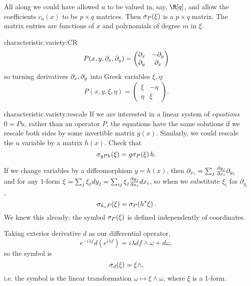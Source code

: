 All along we could have allowed \(u\) to be valued in, say, \(\R[q]\), and allow the coefficients \(c_a(x)\) to be \(p \times q\) matrices.
Then \(\opsymbol[P]{\xi}\) is a \(p \times q\) matrix.
The matrix entries are functions of \(x\) and polynomials of degree \(m\) in \(\xi\).
\begin{answer}{characteristic.variety:CR}
\[
P(x,y,\partial_{x},\partial_{y})
=
\begin{pmatrix}
\partial_{x}&-\partial_{y}\\
\partial_{y}&\partial_{x}
\end{pmatrix}
\]
so turning derivatives \(\partial_{x},\partial_{y}\) into Greek variables \(\xi,\eta\):
\[
P(x,y,\xi,\eta)
=
\begin{pmatrix}
\xi&-\eta\\
\eta&\xi
\end{pmatrix}.
\]
\end{answer}
\begin{problem}{characteristic.variety:rescale}
If we are interested in a linear system of \emph{equations} \(0=Pu\), rather than an operator \(P\), the equations have the same solutions if we rescale both sides by some invertible matrix \(g(x)\).
Similarly, we could rescale the \(u\) variable by a matrix \(h(x)\).
Check that 
\[
\opsymbol[gPh]{\xi}=g\opsymbol[P]{\xi}h.
\]
\end{problem}
If we change variables by a diffeomorphism \(y=h(x)\), then \(\partial_{x_i} = \sum_j \pderiv{y_j}{x_i} \partial_{y_j}\) and for any \(1\)-form \(\xi=\sum_j \xi_j dy_j=\sum_{ij} \xi_j \pderiv{y_j}{x_i} dx_i\), so when we substitute \(\xi_i\) for \(\partial_{y_i}\), 
\[
\opsymbol[h_* P]{\xi} = \opsymbol[P]{h^*\xi}.
\]
We knew this already: the symbol \(\opsymbol[P]{\xi}\) is defined independently of coordinates.
\begin{example}
Taking exterior derivative \(d\) as our differential operator,
\[
e^{-i \lambda f} d(e^{i \lambda f}) = i\lambda df \wedge \omega + d\omega,
\]
so the symbol is
\[
\opsymbol[d]{\xi}=\xi \wedge,
\]
i.e. the symbol is the linear transformation \(\omega \mapsto \xi \wedge \omega\), where \(\xi\) is a \(1\)-form.
\end{example}

